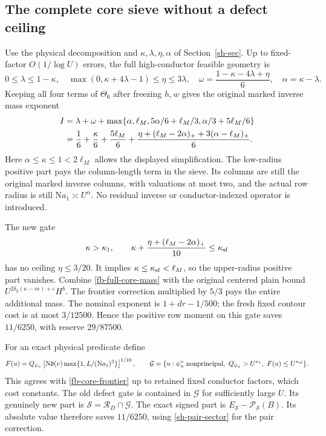 \documentclass[11pt]{article}
\theoremstyle{definition}
\newcommand{\N}{\mathrm N}
\newcommand{\eps}{\varepsilon}
\begin{document}
\subsection{The complete core sieve without a defect ceiling}
Use the physical decomposition and $\kappa,\lambda,\eta,\alpha$
of Section~\ref{sh-sec}. Up to fixed-factor $O(1/\log U)$ errors,
the full high-conductor feasible geometry is
\[
 0\le\lambda\le1-\kappa,\quad
 \max(0,\kappa+4\lambda-1)\le\eta\le3\lambda,\quad
 \omega=\frac{1-\kappa-4\lambda+\eta}{6},\quad
 \alpha=\kappa-\lambda .
\]
Keeping all four terms of $\Theta_6$ after freezing $h,w$ gives
the original marked inverse mass exponent
\begin{align}
 I&=\lambda+\omega+
 \max\{\alpha,\ell_M,5\alpha/6+\ell_M/3,\alpha/3+5\ell_M/6\}
 \notag\\
 &=\frac16+\frac{\kappa}{6}+\frac{5\ell_M}{6}
 +\frac{\eta+(\ell_M-2\alpha)_+
                      +3(\alpha-\ell_M)_+}{6}.
 \label{fb-full-core-mass}
\end{align}
Here $\alpha\le\kappa\le1<2\ell_M$ allows the displayed simplification.
The low-radius positive part pays the column-length term in the
sieve. Its columns are still the original marked inverse columns,
with valuations at most two, and the actual row radius is still
$\N a_1\asymp U^\alpha$. No residual inverse or conductor-indexed
operator is introduced.

The new gate
\begin{equation}\label{fb-core-frontier}
 \kappa>\kappa_1,\qquad
 \kappa+\frac{\eta+(\ell_M-2\alpha)_+}{10}
                  \le\kappa_{\rm sf}
\end{equation}
has no ceiling $\eta\le3/20$. It implies
$\kappa\le\kappa_{\rm sf}<\ell_M$, so the upper-radius positive
part vanishes. Combine \eqref{fb-full-core-mass} with the original
centered plain bound $U^{2\delta_g(\kappa-m)+\eps}H^b$.
The frontier correction multiplied by $5/3$ pays the entire additional
mass. The nominal exponent is $1+dr-1/500$; the fresh fixed contour
cost is at most $3/12500$. Hence the positive row moment on this
gate saves $11/6250$, with reserve $29/87500$.

For an exact physical predicate define
\begin{equation}\label{fb-physical-frontier}
 F(u)=Q_{\psi_u}\left[
 \N\mathfrak d(v)\max\{1,L/(\N a_1)^2\}\right]^{1/10},
 \qquad
 \mathcal G=\{u:\psi_u^*\ {\rm nonprincipal},\
 Q_{\psi_u}>U^{\kappa_1},\ F(u)\le U^{\kappa_{\rm sf}}\}.
\end{equation}
This agrees with \eqref{fb-core-frontier} up to retained fixed
conductor factors, which cost constants. The old defect gate is
contained in $\mathcal G$ for sufficiently large $U$.
Its genuinely new part is $\mathcal S=\mathcal R_D\cap\mathcal G$.
The exact signed part is $E_{\mathcal S}-\mathcal P_{\mathcal S}(B)$.
Its absolute value therefore saves $11/6250$, using
\eqref{sh-pair-sector} for the pair correction.
\end{document}
